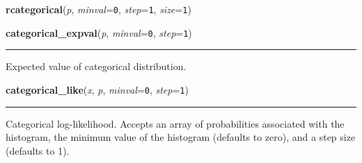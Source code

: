     \label{pymc:distributions:rcategorical}

    \vspace{0.5ex}

    \begin{boxedminipage}{\textwidth}

    \raggedright \textbf{rcategorical}(\textit{p}, \textit{minval}=\texttt{0}, \textit{step}=\texttt{1}, \textit{size}=\texttt{1})

    \end{boxedminipage}

    \label{pymc:distributions:categorical_expval}

    \vspace{0.5ex}

    \begin{boxedminipage}{\textwidth}

    \raggedright \textbf{categorical\_expval}(\textit{p}, \textit{minval}=\texttt{0}, \textit{step}=\texttt{1})

    \vspace{-1.5ex}

    \rule{\textwidth}{0.5\fboxrule}

Expected value of categorical distribution.
    \vspace{1ex}

    \end{boxedminipage}

    \label{pymc:distributions:categorical_like}

    \vspace{0.5ex}

    \begin{boxedminipage}{\textwidth}

    \raggedright \textbf{categorical\_like}(\textit{x}, \textit{p}, \textit{minval}=\texttt{0}, \textit{step}=\texttt{1})

    \vspace{-1.5ex}

    \rule{\textwidth}{0.5\fboxrule}

Categorical log-likelihood.
Accepts an array of probabilities associated with the histogram,
the minimum value of the histogram (defaults to zero),
and a step size (defaults to 1).
    \vspace{1ex}

    \end{boxedminipage}

